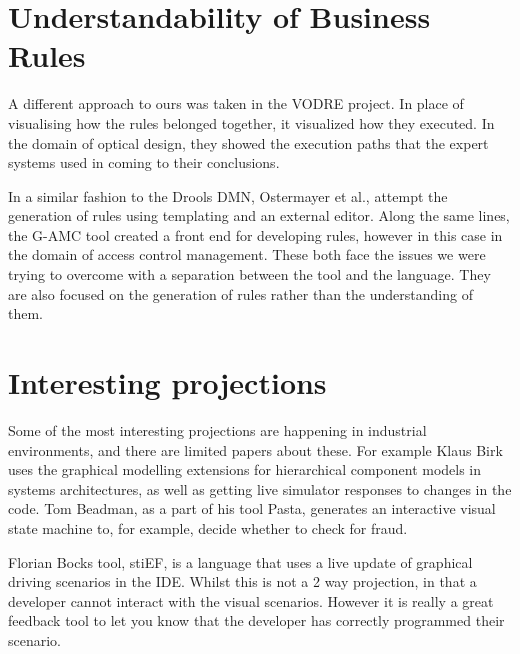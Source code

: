 \section{Understandability of Business Rules}

A different approach to ours was taken in the VODRE project\cite{lapaev2014vodre}.
In place of visualising how the rules belonged together, it visualized how they executed.
In the domain of optical design, they showed the execution paths that the expert systems used in coming to their conclusions.

In a similar fashion to the Drools DMN, Ostermayer et al.\cite{ostermayer2013simplifying}, attempt the generation of rules using templating and an external editor.
Along the same lines, the G-AMC tool\cite{sa2016g} created a front end for developing rules, however in this case in the domain of access control management.
These both face the issues we were trying to overcome with a separation between the tool and the language. 
They are also focused on the generation of rules rather than the understanding of them.

\section{Interesting projections}
Some of the most interesting projections are happening in industrial environments, and there are limited papers about these.
For example Klaus Birk\cite{Birken_Interactive} uses the graphical modelling extensions for hierarchical component models in systems architectures, as well as getting live simulator responses to changes in the code.
Tom Beadman\cite{Beadman_Journey}, as a part of his tool Pasta, generates an interactive visual state machine to, for example, decide whether to check for fraud. 

Florian Bocks tool, stiEF\cite{Bock_stief}, is a language that uses a live update of graphical driving scenarios in the IDE.
Whilst this is not a 2 way projection, in that a developer cannot interact with the visual scenarios.
However it is really a great feedback tool to let you know that the developer has correctly programmed their scenario. 